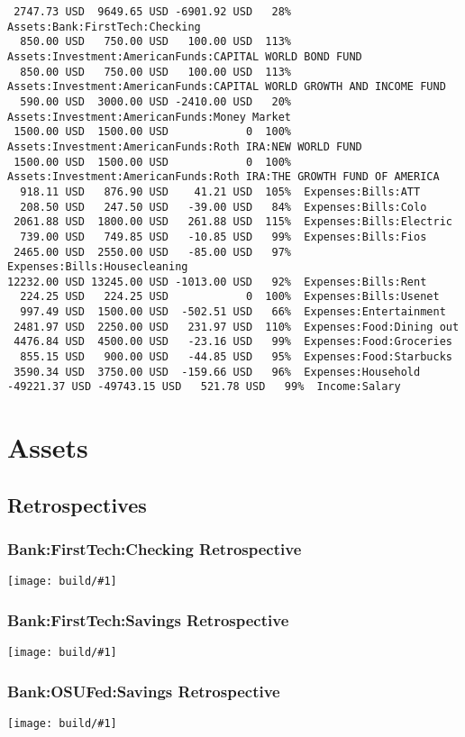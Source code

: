 \documentclass[pdftex,12pt,letterpaper]{report}
\newcommand{\insertplot}[1]{\texttt{[image: build/\#1]}\\[1cm]}
\begin{document}
\begin{verbatim}
 2747.73 USD  9649.65 USD -6901.92 USD   28%  Assets:Bank:FirstTech:Checking
  850.00 USD   750.00 USD   100.00 USD  113%  Assets:Investment:AmericanFunds:CAPITAL WORLD BOND FUND
  850.00 USD   750.00 USD   100.00 USD  113%  Assets:Investment:AmericanFunds:CAPITAL WORLD GROWTH AND INCOME FUND
  590.00 USD  3000.00 USD -2410.00 USD   20%  Assets:Investment:AmericanFunds:Money Market
 1500.00 USD  1500.00 USD            0  100%  Assets:Investment:AmericanFunds:Roth IRA:NEW WORLD FUND
 1500.00 USD  1500.00 USD            0  100%  Assets:Investment:AmericanFunds:Roth IRA:THE GROWTH FUND OF AMERICA
  918.11 USD   876.90 USD    41.21 USD  105%  Expenses:Bills:ATT
  208.50 USD   247.50 USD   -39.00 USD   84%  Expenses:Bills:Colo
 2061.88 USD  1800.00 USD   261.88 USD  115%  Expenses:Bills:Electric
  739.00 USD   749.85 USD   -10.85 USD   99%  Expenses:Bills:Fios
 2465.00 USD  2550.00 USD   -85.00 USD   97%  Expenses:Bills:Housecleaning
12232.00 USD 13245.00 USD -1013.00 USD   92%  Expenses:Bills:Rent
  224.25 USD   224.25 USD            0  100%  Expenses:Bills:Usenet
  997.49 USD  1500.00 USD  -502.51 USD   66%  Expenses:Entertainment
 2481.97 USD  2250.00 USD   231.97 USD  110%  Expenses:Food:Dining out
 4476.84 USD  4500.00 USD   -23.16 USD   99%  Expenses:Food:Groceries
  855.15 USD   900.00 USD   -44.85 USD   95%  Expenses:Food:Starbucks
 3590.34 USD  3750.00 USD  -159.66 USD   96%  Expenses:Household
-49221.37 USD -49743.15 USD   521.78 USD   99%  Income:Salary

\end{verbatim}

\chapter{Assets}
\section{Retrospectives}
\subsection{Bank:FirstTech:Checking Retrospective}
\insertplot{Assets:Bank:FirstTech:Checkingretro}
\subsection{Bank:FirstTech:Savings Retrospective}
\insertplot{Assets:Bank:FirstTech:Savingsretro}
\subsection{Bank:OSUFed:Savings Retrospective}
\insertplot{Assets:Bank:OSUFed:Savingsretro}
\end{document}
